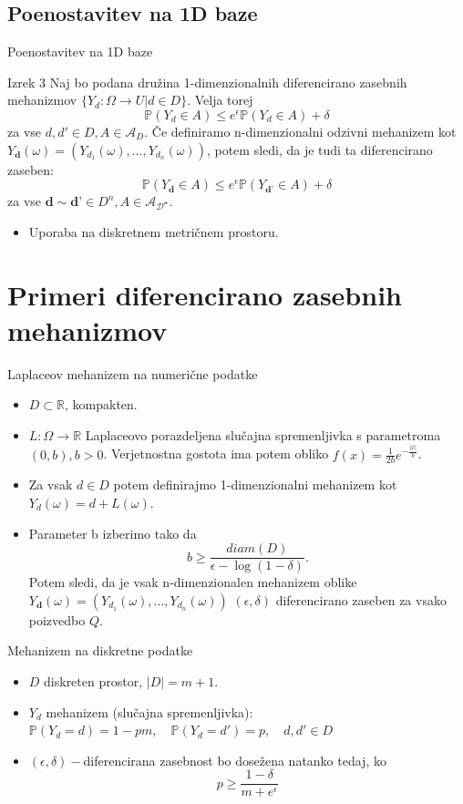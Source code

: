 \documentclass{beamer}
\begin{document}
\subsection{Poenostavitev na 1D baze}
\begin{frame}{Poenostavitev na 1D baze}
\begin{block}{Izrek 3}
Naj bo podana družina 1-dimenzionalnih diferencirano zasebnih mehanizmov $\{ Y_d: \Omega \rightarrow U | d \in D\}$. Velja torej
$$\mathbb{P}(Y_d \in A) \leq e^\epsilon \mathbb{P}(Y_d \in A) + \delta$$ 
za vse $d,d' \in D, A \in \mathcal{A}_D$. Če definiramo n-dimenzionalni odzivni mehanizem kot $Y_{\textbf{d}} (\omega) = (Y_{d_1} (\omega) , ... , Y_{d_n} (\omega))$, potem sledi, da je tudi ta diferencirano zaseben:
$$\mathbb{P}(Y_{\textbf{d}} \in A) \leq e^\epsilon \mathbb{P}(Y_{\textbf{d'}} \in A) + \delta$$
za vse $\textbf{d} \sim \textbf{d'} \in D^n, A \in \mathcal{A_{D^n}}$.
\end{block}
\begin{itemize}
\item Uporaba na diskretnem metričnem prostoru.
\end{itemize}
\end{frame}

\section{Primeri diferencirano zasebnih mehanizmov}
\begin{frame}{Laplaceov mehanizem na numerične podatke}
\begin{itemize}
\item  $D \subset \mathbb{R}$, kompakten. 
\item $L: \Omega \rightarrow \mathbb{R}$ Laplaceovo porazdeljena slučajna spremenljivka s parametroma $(0,b), b > 0$. 
Verjetnostna gostota ima potem obliko $f(x)=\frac{1}{2b}e^{-\frac{|x|}{b}}$.  
\item Za vsak $d \in D$ potem definirajmo 1-dimenzionalni mehanizem kot  $Y_{d}(\omega) = d + L(\omega)$. 
\item Parameter b izberimo tako da 
$$b\geq \frac{diam(D)}{\epsilon - \log(1-\delta)}.$$
Potem sledi, da je vsak n-dimenzionalen mehanizem oblike $Y_{\textbf{d}} (\omega) = (Y_{d_1} (\omega) , ... , Y_{d_n} (\omega))$ $(\epsilon, \delta)$ diferencirano zaseben za vsako poizvedbo $Q$. 
\end{itemize}
\end{frame}

\begin{frame}{Mehanizem na diskretne podatke}
\begin{itemize}
\item $D$ diskreten prostor, $|D| = m + 1$.
\item $Y_d$ mehanizem (slučajna spremenljivka): $\mathbb{P} (Y_d = d) = 1 - pm, \quad \mathbb{P}(Y_d = d') = p, \quad d, d' \in D$
\item $(\epsilon, \delta)-$diferencirana zasebnost bo dosežena natanko tedaj, ko $$p \geq \frac{1 - \delta}{m + e^{\epsilon}}$$
\end{itemize}
\end{frame}
\end{document}
